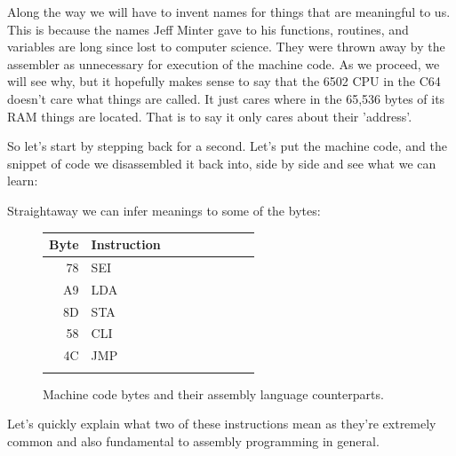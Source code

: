 Along the way we will have to invent names for things that are meaningful to us. This is because the names Jeff Minter gave to his
functions, routines, and variables are long since lost to computer science. They were thrown away by the assembler as unnecessary
for execution of the machine code. As we proceed, we will see why, but it hopefully makes sense to say that the
6502 CPU in the C64 doesn't care what things are called. It just cares where in the 65,536 bytes of its RAM things
are located. That is to say it only cares about their 'address'.

So let's start by stepping back for a second. Let's put the machine code, and the snippet of code we disassembled it
back into, side by side and see what we can learn:

\begin{minipage}[b]{0.45\linewidth}
\centering

\end{minipage}
\hspace{0.5cm}
\begin{minipage}[b]{0.45\linewidth}
\centering

\end{minipage}


Straightaway we can infer meanings to some of the bytes:

\begin{figure}[H]
  {
    \setlength{\tabcolsep}{3.0pt}
    \setlength\cmidrulewidth{\heavyrulewidth} %
    \begin{adjustbox}{width=3cm,center}

      \begin{tabular}{rllllllll}
        \toprule
        Byte & Instruction &\\
        \midrule
78 & SEI & \\
A9 & LDA & \\
8D & STA & \\
58 & CLI & \\
4C & JMP & \\
        \addlinespace
        \bottomrule
      \end{tabular}
    \end{adjustbox}
  }\caption{Machine code bytes and their assembly language counterparts.}
\end{figure}

Let's quickly explain what two of these instructions mean as they're extremely common and also fundamental to
assembly programming in general.

